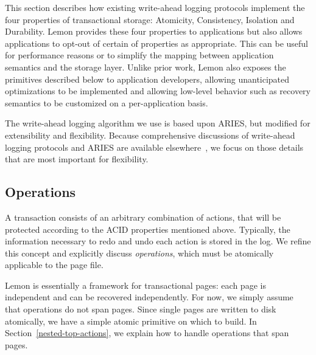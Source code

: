 \documentclass[letterpaper,twocolumn,english]{article}
\newcommand{\yad}{Lemon\xspace}
\begin{document}
This section describes how existing write-ahead logging protocols
implement the four properties of transactional storage: Atomicity,
Consistency, Isolation and Durability.  \yad provides these four
properties to applications but also allows applications to opt-out of
certain of properties as appropriate.  This can be useful for
performance reasons or to simplify the mapping between application
semantics and the storage layer.  Unlike prior work, \yad also exposes
the primitives described below to application developers, allowing
unanticipated optimizations to be implemented and allowing low-level
behavior such as recovery semantics to be customized on a
per-application basis.

The write-ahead logging algorithm we use is based upon ARIES, but
modified for extensibility and flexibility. Because comprehensive
discussions of write-ahead logging protocols and ARIES are available
elsewhere~\cite{haerder, aries}, we focus on those details that are
most important for flexibility.


\subsection{Operations}
\label{sub:OperationProperties}

A transaction consists of an arbitrary combination of actions, that
will be protected according to the ACID properties mentioned above.
Typically, the
information necessary to redo and undo each action is stored in the
log.  We refine this concept and explicitly discuss {\em operations},
which must be atomically applicable to the page file.  

\yad is essentially a framework for transactional pages: each page is
independent and can be recovered independently. For now, we simply
assume that operations do not span pages.  Since single pages are
written to disk atomically, we have a simple atomic primitive on which
to build. In Section~\ref{nested-top-actions}, we explain how to
handle operations that span pages.
\end{document}
